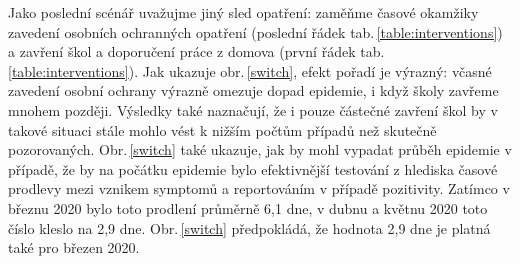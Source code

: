 Jako poslední scénář uvažujme jiný sled opatření: zaměňme časové okamžiky zavedení osobních ochranných opatření (poslední řádek tab.\,\ref{table:interventions}) a zavření škol a doporučení práce z domova (první řádek tab.\,\ref{table:interventions}). Jak ukazuje obr.\,\ref{switch}, efekt pořadí je výrazný: včasné zavedení osobní ochrany výrazně omezuje dopad epidemie, i když školy zavřeme mnohem později. Výsledky také naznačují, že i pouze částečné zavření škol by v takové situaci stále mohlo vést k nižším počtům případů než skutečně pozorovaných. Obr.\,\ref{switch} také ukazuje, jak by mohl vypadat průběh epidemie v případě, že by na počátku epidemie bylo efektivnější testování z hlediska časové prodlevy mezi vznikem symptomů a reportováním v případě pozitivity. Zatímco v březnu 2020 bylo toto prodlení průměrně 6,1 dne, v dubnu a květnu 2020 toto číslo kleslo na 2,9 dne. Obr.\,\ref{switch} předpokládá, že hodnota 2,9 dne je platná také pro březen 2020.

